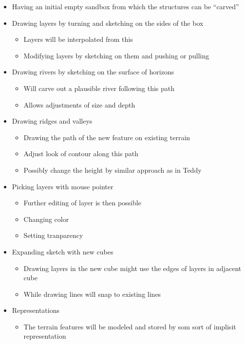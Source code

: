 \documentclass[12pt,a4paper]{article}
\begin{document}
\begin{itemize}
 \item Having an initial empty sandbox from which the structures can be ``carved''
 \item Drawing layers by turning and sketching on the sides of the box
    \begin{itemize}
     \item Layers will be interpolated from this
     \item Modifying layers by sketching on them and pushing or pulling
    \end{itemize}
 \item Drawing rivers by sketching on the surface of horizons
    \begin{itemize}
     \item Will carve out a plausible river following this path
     \item Allows adjustments of size and depth
    \end{itemize}
  \item Drawing ridges and valleys
    \begin{itemize}
     \item Drawing the path of the new feature on existing terrain
     \item Adjust look of contour along this path
     \item Possibly change the height by similar approach as in Teddy
    \end{itemize}
\item Picking layers with mouse pointer
    \begin{itemize}
     \item Further editing of layer is then possible
     \item Changing color
     \item Setting tranparency
    \end{itemize}
\item Expanding sketch with new cubes
    \begin{itemize}
     \item Drawing layers in the new cube might use the edges of layers in adjacent cube
     \item While drawing lines will snap to existing lines
    \end{itemize}
\item Representations
    \begin{itemize}
     \item The terrain features will be modeled and stored by som sort of implisit representation

\end{itemize}
\end{itemize}
\end{document}
